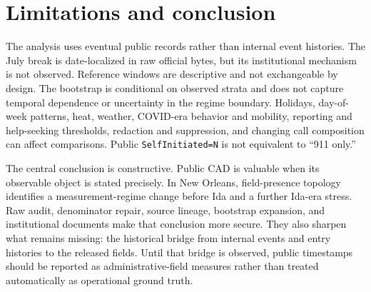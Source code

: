 \documentclass[11pt]{article}
\begin{document}
\section{Limitations and conclusion}

The analysis uses eventual public records rather than internal event histories. The July break is date-localized in raw official bytes, but its institutional mechanism is not observed. Reference windows are descriptive and not exchangeable by design. The bootstrap is conditional on observed strata and does not capture temporal dependence or uncertainty in the regime boundary. Holidays, day-of-week patterns, heat, weather, COVID-era behavior and mobility, reporting and help-seeking thresholds, redaction and suppression, and changing call composition can affect comparisons. Public \texttt{SelfInitiated=N} is not equivalent to ``911 only.''

The central conclusion is constructive. Public CAD is valuable when its observable object is stated precisely. In New Orleans, field-presence topology identifies a measurement-regime change before Ida and a further Ida-era stress. Raw audit, denominator repair, source lineage, bootstrap expansion, and institutional documents make that conclusion more secure. They also sharpen what remains missing: the historical bridge from internal events and entry histories to the released fields. Until that bridge is observed, public timestamps should be reported as administrative-field measures rather than treated automatically as operational ground truth.



\end{document}
